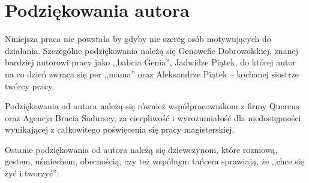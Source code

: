 \chapter{Podziękowania autora}
\label{cha:dodatekB}

Niniejsza praca nie powstała by gdyby nie szereg osób motywujących do działania. Szczególne podziękowania należą się Genowefie Dobrowolskiej, znanej bardziej autorowi pracy jako ,,babcia Genia'', Jadwidze Piątek, do której autor na co dzień zwraca się per ,,mama'' oraz Aleksandrze Piątek -- kochanej siostrze twórcy pracy.

Podziękowania od autora należą się również współpracownikom z firmy Quercus oraz Agencja Bracia Sadurscy, za cierpliwość i wyrozumiałość dla niedostępności wynikającej z całkowitego poświęcenia się pracy magisterskiej.

Ostanie podziękowania od autora należą się dziewczynom, które rozmową, gestem, uśmiechem, obecnością, czy też wspólnym tańcem sprawiają, że ,,chce się żyć i tworzyć'':

